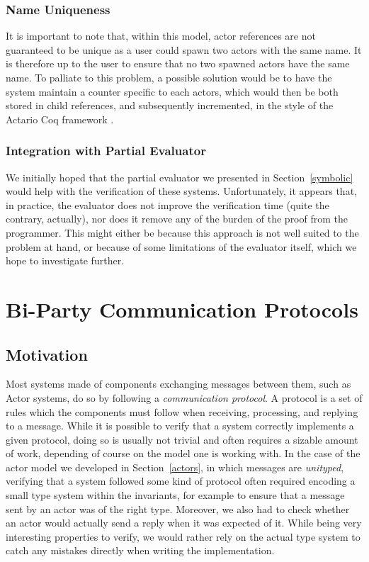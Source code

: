 \documentclass[a4paper,twoside]{article}
\newcommand{\RefSec}[1]{Section~\ref{#1}}
\begin{document}
\subsubsection*{Name Uniqueness}

It is important to note that, within this model, actor references are not guaranteed to be unique as a user could spawn two actors with the same name. It is therefore up to the user to ensure that no two spawned actors have the same name. To palliate to this problem, a possible solution would be to have the system maintain a counter specific to each actors, which would then be both stored in child references, and subsequently incremented, in the style of the Actario Coq framework \cite{actario}.

\subsubsection*{Integration with Partial Evaluator}

We initially hoped that the partial evaluator we presented in \RefSec{symbolic} would help with the verification of these systems. Unfortunately, it appears that, in practice, the evaluator does not improve the verification time (quite the contrary, actually), nor does it remove any of the burden of the proof from the programmer. This might either be because this approach is not well suited to the problem at hand, or because of some limitations of the evaluator itself, which we hope to investigate further.

\clearpage
\section{Bi-Party Communication Protocols}
\label{biparty}

\subsection{Motivation}
\label{sess-mot}

Most systems made of components exchanging messages between them, such as Actor systems, do so by following a \textit{communication protocol}. A protocol is a set of rules which the components must follow when receiving, processing, and replying to a message. While it is possible to verify that a system correctly implements a given protocol, doing so is usually not trivial and often requires a sizable amount of work, depending of course on the model one is working with. In the case of the actor model we developed in \RefSec{actors}, in which messages are \textit{unityped}, verifying that a system followed some kind of protocol often required encoding a small type system within the invariants, for example to ensure that a message sent by an actor was of the right type. Moreover, we also had to check whether an actor would actually send a reply when it was expected of it. While being very interesting properties to verify, we would rather rely on the actual type system to catch any mistakes directly when writing the implementation.
\end{document}
